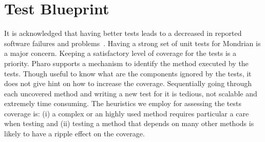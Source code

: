 \documentclass[runningheads]{llncs}
\newcommand{\seclabel}[1]{\label{sec:#1}}
\newcommand{\figref}[1]{Figure~\ref{fig:#1}}
\newcommand{\tablabel}[1]{\label{tab:#1}}
\begin{document}
\section{Test Blueprint} \seclabel{testblueprint}

%
%
%
%

It is acknowledged that having better tests leads to a decreased in reported software failures and problems~\cite{Mock09a}. Having a strong set of unit tests for Mondrian is a major concern. Keeping a satisfactory level of coverage for the tests is a priority. Pharo supports a mechanism to identify the method executed by the tests. Though useful to know what are the components ignored by the tests, it does not give hint on how to increase the coverage. Sequentially going through each uncovered method and writing a new test for it is tedious, not scalable and extremely time consuming. The heuristics we employ for assessing the tests coverage is: (i) a complex or an highly used method requires particular a care when testing and (ii) testing a method that depends on many other methods is likely to have a ripple effect on the coverage.
\end{document}
